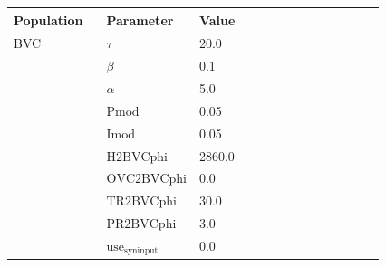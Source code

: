 \documentclass{article}
\begin{document}
\noindent
\begin{tabularx}{\linewidth}{|p{0.25\linewidth}|p{0.25\linewidth}|X|}\hline
\textbf{Population} & \textbf{Parameter} & \textbf{Value}   \\ \hline

    BVC             & $\tau$        & 20.0  \\ \hline

                 & $\beta$        & 0.1  \\ \hline

                 & $\alpha$        & 5.0  \\ \hline

                 & ${\text{Pmod}}$        & 0.05  \\ \hline

                 & ${\text{Imod}}$        & 0.05  \\ \hline

                 & ${\text{H2BVCphi}}$        & 2860.0  \\ \hline

                 & ${\text{OVC2BVCphi}}$        & 0.0  \\ \hline

                 & ${\text{TR2BVCphi}}$        & 30.0  \\ \hline

                 & ${\text{PR2BVCphi}}$        & 3.0  \\ \hline

                 & ${\text{use}}_{\text{syninput}}$        & 0.0  \\ \hline

\end{tabularx}

\vspace{2ex}
\end{document}
